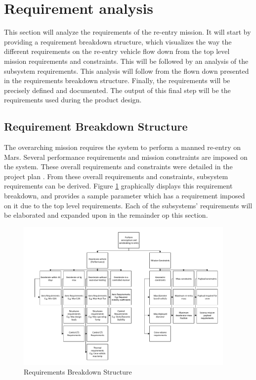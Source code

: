 \section{Requirement analysis} \label{ch:req}
This section will analyze the requirements of the re-entry mission. It will start by providing a requirement breakdown structure, which visualizes the way the different requirements on the re-entry vehicle flow down from the top level mission requirements and constraints. This will be followed by an analysis of the subsystem requirements. This analysis will follow from the flown down presented in the requirements breakdown structure. Finally, the requirements will be precisely defined and documented. The output of this final step will be the requirements used during the product design. %

\subsection{Requirement Breakdown Structure}
The overarching mission requires the system to perform a manned re-entry on Mars. Several performance requirements and mission constraints are imposed on the system. These overall requirements and constraints were detailed in the project plan \cite{Balasooriyan2015}. From these overall requirements and constraints, subsystem requirements can be derived. Figure \ref{fig:RBS} graphically displays this requirement breakdown, and provides a sample parameter which has a requirement imposed on it due to the top level requirements. Each of the subsystems' requirements will be elaborated and expanded upon in the remainder op this section. 

\begin{figure}[h]
\centering
\includegraphics[width=0.95\textwidth]{Figure/RBS.pdf}
\caption{Requirements Breakdown Structure} \label{fig:RBS}
\end{figure}

